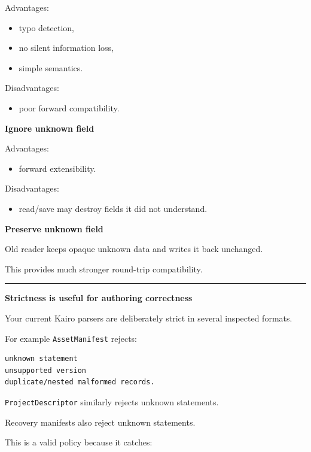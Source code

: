 Advantages:

\begin{itemize}
\tightlist
\item
  typo detection,
\item
  no silent information loss,
\item
  simple semantics.
\end{itemize}

Disadvantages:

\begin{itemize}
\tightlist
\item
  poor forward compatibility.
\end{itemize}

\textbf{Ignore unknown field}

Advantages:

\begin{itemize}
\tightlist
\item
  forward extensibility.
\end{itemize}

Disadvantages:

\begin{itemize}
\tightlist
\item
  read/save may destroy fields it did not understand.
\end{itemize}

\textbf{Preserve unknown field}

Old reader keeps opaque unknown data and writes it back unchanged.

This provides much stronger round-trip compatibility.

\begin{center}\rule{0.5\linewidth}{0.5pt}\end{center}

\textbf{Strictness is useful for authoring correctness}

Your current Kairo parsers are deliberately strict in several inspected formats.

For example \texttt{AssetManifest} rejects:

\begin{verbatim}
unknown statement
unsupported version
duplicate/nested malformed records.
\end{verbatim}

\texttt{ProjectDescriptor} similarly rejects unknown statements.

Recovery manifests also reject unknown statements.

This is a valid policy because it catches:

